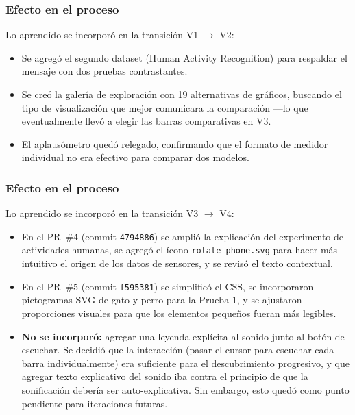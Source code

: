 \documentclass{article}
\begin{document}
\subsubsection{Efecto en el proceso}

Lo aprendido se incorpor\'{o} en la transici\'{o}n V1 $\rightarrow$ V2:
\begin{itemize}
  \item Se agreg\'{o} el segundo dataset (Human Activity Recognition) para respaldar el
        mensaje con dos pruebas contrastantes.
  \item Se cre\'{o} la galer\'{i}a de exploraci\'{o}n con 19 alternativas de gr\'{a}ficos,
        buscando el tipo de visualizaci\'{o}n que mejor comunicara la comparaci\'{o}n ---lo que
        eventualmente llev\'{o} a elegir las barras comparativas en V3.
  \item El aplaus\'{o}metro qued\'{o} relegado, confirmando que el formato de medidor
        individual no era efectivo para comparar dos modelos.
\end{itemize}

\subsubsection{Efecto en el proceso}

Lo aprendido se incorpor\'{o} en la transici\'{o}n V3 $\rightarrow$ V4:
\begin{itemize}
  \item En el PR~\#4 (commit \texttt{4794886}) se ampli\'{o} la explicaci\'{o}n del
        experimento de actividades humanas, se agreg\'{o} el \'{i}cono
        \texttt{rotate\_phone.svg} para hacer m\'{a}s intuitivo el origen de los datos de
        sensores, y se revis\'{o} el texto contextual.
  \item En el PR~\#5 (commit \texttt{f595381}) se simplific\'{o} el CSS, se incorporaron
        pictogramas SVG de gato y perro para la Prueba 1, y se ajustaron proporciones
        visuales para que los elementos peque\~{n}os fueran m\'{a}s legibles.
  \item \textbf{No se incorpor\'{o}:} agregar una leyenda expl\'{i}cita al sonido junto
        al bot\'{o}n de escuchar. Se decidi\'{o} que la interacci\'{o}n
        (pasar el cursor para escuchar cada barra individualmente) era suficiente para el
        descubrimiento progresivo, y que agregar texto explicativo del sonido iba contra el
        principio de que la sonificaci\'{o}n deber\'{i}a ser auto-explicativa. Sin embargo,
        esto qued\'{o} como punto pendiente para iteraciones futuras.
\end{itemize}
\end{document}
